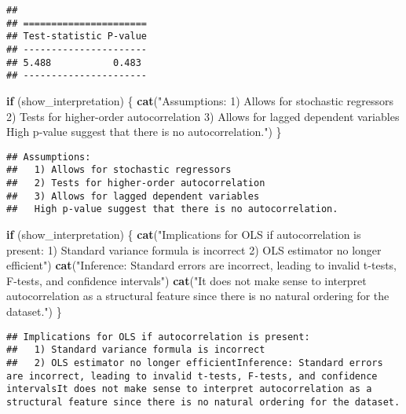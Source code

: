 \documentclass[
]{article}
\newenvironment{Shaded}{\begin{snugshade}}{\end{snugshade}}
\newcommand{\ControlFlowTok}[1]{\textcolor[rgb]{0.13,0.29,0.53}{\textbf{#1}}}
\newcommand{\FunctionTok}[1]{\textcolor[rgb]{0.13,0.29,0.53}{\textbf{#1}}}
\newcommand{\NormalTok}[1]{#1}
\newcommand{\StringTok}[1]{\textcolor[rgb]{0.31,0.60,0.02}{#1}}
\begin{document}
\begin{verbatim}
## 
## ======================
## Test-statistic P-value
## ----------------------
## 5.488           0.483 
## ----------------------
\end{verbatim}

\begin{Shaded}
\begin{Highlighting}[]
\ControlFlowTok{if}\NormalTok{ (show\_interpretation) \{}
  \FunctionTok{cat}\NormalTok{(}\StringTok{"Assumptions:}
\StringTok{  1) Allows for stochastic regressors}
\StringTok{  2) Tests for higher{-}order autocorrelation}
\StringTok{  3) Allows for lagged dependent variables}
\StringTok{  High p{-}value suggest that there is no autocorrelation."}\NormalTok{)}
\NormalTok{  \}}
\end{Highlighting}
\end{Shaded}

\begin{verbatim}
## Assumptions:
##   1) Allows for stochastic regressors
##   2) Tests for higher-order autocorrelation
##   3) Allows for lagged dependent variables
##   High p-value suggest that there is no autocorrelation.
\end{verbatim}

\begin{Shaded}
\begin{Highlighting}[]
\ControlFlowTok{if}\NormalTok{ (show\_interpretation) \{}
  \FunctionTok{cat}\NormalTok{(}\StringTok{"Implications for OLS if autocorrelation is present:}
\StringTok{  1) Standard variance formula is incorrect}
\StringTok{  2) OLS estimator no longer efficient"}\NormalTok{)}
  \FunctionTok{cat}\NormalTok{(}\StringTok{"Inference: Standard errors are incorrect, leading to invalid t{-}tests, F{-}tests, and confidence intervals"}\NormalTok{)}
  \FunctionTok{cat}\NormalTok{(}\StringTok{"It does not make sense to interpret autocorrelation as a structural feature since there is no natural ordering for the dataset."}\NormalTok{)}
\NormalTok{  \}}
\end{Highlighting}
\end{Shaded}

\begin{verbatim}
## Implications for OLS if autocorrelation is present:
##   1) Standard variance formula is incorrect
##   2) OLS estimator no longer efficientInference: Standard errors are incorrect, leading to invalid t-tests, F-tests, and confidence intervalsIt does not make sense to interpret autocorrelation as a structural feature since there is no natural ordering for the dataset.
\end{verbatim}
\end{document}
